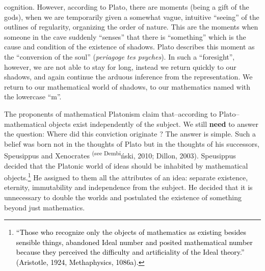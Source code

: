 \documentclass[a4paper]{article}
\newcommand\textstyleFootnoteCharacters[1]{\textsuperscript{#1}}
\newcommand\textstyleInternetlink[1]{\textcolor{blue}{#1}}
\begin{document}
cognition. However, according to Plato, there are moments (being a gift of the gods), when we are temporarily given a
somewhat vague, intuitive “seeing” of the outlines of regularity, organizing the order of nature.  This are the moments
when someone in the cave suddenly “senses” that there is “something” which is the cause and condition of the existence
of shadows. Plato describes\textbf{ }this moment as the “conversion of the soul” (\textit{periagoge tes psyches}). In
such a “foresight”, however, we are not able to stay for long, instead we return quickly to our shadows, and again
continue the arduous inference from the representation. We return to our mathematical world of shadows, to our
mathematics named with the lowercase “m”. 

The proponents of mathematical Platonism claim that–according to Plato–mathematical %
objects exist independently of the subject. We still \textbf{need} to answer the question: Where did this conviction  %
originate%
? The answer is simple. Such a belief was born not in the thoughts of Plato but in the thoughts of his successors,
Speusippus and Xenocrates \label{ref:RNDpbYvB44iPJ}\textstyleFootnoteCharacters{(see Dembi}ński, 2010; Dillon, 2003).
Speusippus decided that the Platonic world of ideas should be inhabited by mathematical
objects.\footnote{\textcolor{black}{ “Those}\textstyleInternetlink{\textsuperscript{ }}\textcolor{black}{who recognize
only the objects of mathematics as existing besides sensible things, abandoned Ideal number and posited mathematical
number because they perceived the difficulty and artificiality of the Ideal theory.”
}\label{ref:RNDv7b1rw2c8M}\textcolor{black}{(Aristotle, 1924, Methaphysics, 1086a)}\textcolor{black}{.}} He assigned to
them all the attributes of an idea: separate existence, eternity, immutability and independence from the subject. He
decided that it is unnecessary to double the worlds and postulated the existence of something beyond just mathematics.
\end{document}
